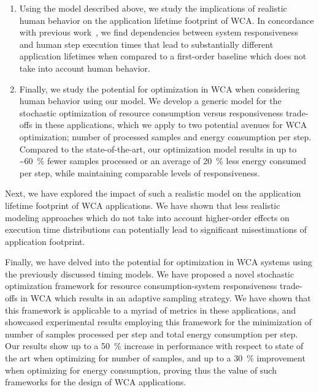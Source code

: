 \begin{enumerate}
    \item\label{item:contrib:footprint} Using the model described above, we study the implications of realistic human behavior on the application lifetime footprint of \ac{WCA}.
    In concordance with previous work~\cite{olguinmunoz:impact2021}, we find dependencies between system responsiveness and human step execution times that lead to substantially different application lifetimes when compared to a first-order baseline which does not take into account human behavior.
    \item\label{item:contrib:optimization} Finally, we study the potential for optimization in \ac{WCA} when considering human behavior using our model.
    We develop a generic model for the stochastic optimization of resource consumption versus responsiveness trade-offs in these applications, which we apply to two potential avenues for \ac{WCA} optimization; number of processed samples and energy consumption per step.
    Compared to the state-of-the-art, our optimization model results in up to \textasciitilde\SI{60}{\percent} fewer samples processed or an average of \SI{20}{\percent} less energy consumed per step, while maintaining comparable levels of responsiveness.
\end{enumerate}

Next, we have explored the impact of such a realistic model on the application lifetime footprint of \ac{WCA} applications.
We have shown that less realistic modeling approaches which do not take into account higher-order effects on execution time distributions can potentially lead to significant misestimations of application footprint.

Finally, we have delved into the potential for optimization in \ac{WCA} systems using the previously discussed timing models.
We have proposed a novel stochastic optimization framework for resource consumption-system responsiveness trade-offs in \ac{WCA} which results in an adaptive sampling strategy.
We have shown that this framework is applicable to a myriad of metrics in these applications, and showcased experimental results employing this framework for the minimization of number of samples processed per step and total energy consumption per step.
Our results show up to a \SI{50}{\percent} increase in performance with respect to state of the art when optimizing for number of samples, and up to a \SI{30}{\percent} improvement when optimizing for energy consumption, proving thus the value of such frameworks for the design of \ac{WCA} applications.

